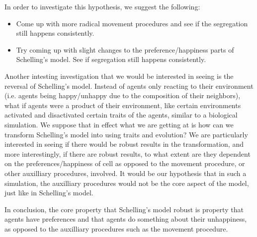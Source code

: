 \documentclass[11pt,twoside]{amsart}
\theoremstyle{theorem}
\theoremstyle{definition}
\theoremstyle{remark}
\begin{document}
In order to investigate this hypothesis, we suggest the following:
\begin{itemize}
    \item Come up with more radical movement procedures and see if the segregation still happens consistently.
    \item Try coming up with slight changes to the preference/happiness parts of Schelling's model. See if segregation still happens consistently.
\end{itemize}

Another intesting investigation that we would be interested in seeing is the reversal of Schelling's model.
Instead of agents only reacting to their environment (i.e. agents being happy/unhappy due to the composition of their neighbors), what if agents were a product of their environment, like certain environments activated and disactivated certain traits of the agents, similar to a biological simulation. 
We suppose that in effect what we are getting at is how can we transform Schelling's model into using traits and evolution?
We are particularly interested in seeing if there would be robust results in the transformation, and more interestingly, if there are robust results, to what extent are they dependent on the preferences/happiness of cell as opposed to the movement procedure, or other auxilliary procedures, involved.
It would be our hypothesis that in such a simulation, the auxilliary procedures would not be the core aspect of the model, just like in Schelling's model.

In conclusion, the core property that Schelling's model robust is property that agents have preferences and that agents do something about their unhappiness, as opposed to the auxilliary procedures such as the movement procedure. 
\printbibliography
\end{document}
